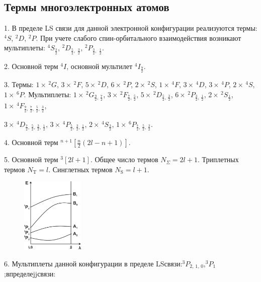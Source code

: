 \subsection{Термы многоэлектронных атомов}
1. В пределе LS связи для данной электронной конфигурации реализуются термы: $^4S$, $^2D$, $^2P$. При учете слабого спин-орбитального взаимодействия возникают мультиплеты:  $^4S_{\frac32}$, $^2D_{\frac52,\,\,\frac32}$, $^2P_{\frac32,\,\,\frac12}$.\par
2. Основной терм $^4I$, основной мультилет $^4I_{\frac92}$.\par
3. Термы: $1 \times \,^2G$, $ 3 \times \,^2F$, $ 5 \times \,^2D$, $ 6 \times \,^2P$, $ 2 \times \,^2S$, $1 \times \,^4F$, $ 3 \times \,^4D$, $ 3 \times \,^4P$, $ 2 \times \,^4S$, $1 \times \, ^6P$. Мультиплеты: $1 \times \,^2G_{\frac92,\,\frac72}$, $ 3 \times \,^2F_{\frac72,\,\frac52}$, $ 5 \times \,^2D_{\frac52,\,\frac32}$, $ 6 \times \,^2P_{\frac32,\,\frac12}$, $ 2 \times \,^2S_{\frac12}$, $1 \times \,^4F_{\frac92,\,\frac72,\,\frac52,\,\frac32}$, \par
\vspace{-\parskip+1.3mm}
$ 3 \times \,^4D_{\frac72,\,\frac52,\,\frac32,\,\frac12}$, $ 3 \times \,^4P_{\frac52,\,\frac32,\,\frac12}$, $ 2 \times \,^4S_{\frac32}$, $1 \times \,^6P_{\frac72,\,\frac52,\,\frac32}$.\par
4. Основной терм $^{n+1}\left[\frac n2 (2l-n+1)\right]$.\par
5. Основной терм $^{3}\left[ 2l+1 \right]$. Общее число термов $N_{\Sigma}=2l+1$. Триплетных термов $N_{\text{T}}=l$. Синглетных термов $N_{\text{S}}=l+1$.\par
\begin{figure} %
    \centering
    \vspace{-2mm}
    \includegraphics[width=30mm]{images/Fig_1_2_6_dec.png}
    \vspace{-3mm}
\end{figure}
6. Мультиплеты данной конфигурации в пределе LS\hspace{\fill}связи:\hspace{\fill}$^3P_{2,\,1,\,0}$,\hspace{\fill}$^3P_{1}$;\hspace{\fill}в\hspace{\fill}пределе\hspace{\fill}jj\hspace{\fill}связи:\par
